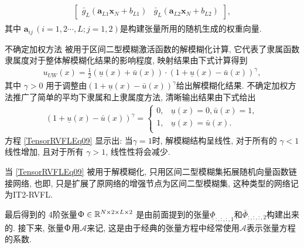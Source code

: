 {\begin{align*}
\begin{array} {cc}
\begin{bmatrix}
  \bar g_L(\bm {a} _{L1}  \bm x_N+b_{L1} )&\bar g_L(\bm {a} _{L2}  \bm x_N+b_{L2} )
\end{bmatrix},
\end{array}
\end{align*}
其中 $\bm {a} _{ij} \,(i=1,2\cdots,L; j=1,2)$是构建张量所用的随机生成的权重向量.
\begin{remark}
不确定加权方法\cite{RunklerCoupland2018-6356}  被用于区间二型模糊激活函数的解模糊化计算,
它代表了隶属函数隶属度对于整体解模糊化结果的影响程度, 映射结果由下式计算得到
\begin{align} \label{TensorRVFLEq08}
    u_{UW} (x) =\frac 1 2 (\underline u(x) + \bar u(x))\cdot (1+\underline u(x)-\bar u(x))^\gamma,
\end{align}
其中 $\gamma > 0$ 用于调整由$(1+\underline u(x)-\bar u(x))^\gamma$给出解模糊化结果.
不确定加权方法推广了简单的平均下隶属和上隶属度方法, 清晰输出结果由下式给出
\begin{align} \label{TensorRVFLEq09}
  (1+\underline u(x)-\bar u(x))^\gamma=
  \left\{
  \begin{array} {ll}
    0,& \underline u(x)=0, \bar u(x)=1,\\
    1,&\underline u(x)=\bar u(x).\\
  \end{array}
  \right.
\end{align}
方程 \eqref{TensorRVFLEq09} 显示出: 当$\gamma =1$时, 解模糊结构呈线性, 对于所有的 $\gamma<1$ 线性增加, 且对于所有 $\gamma>1$, 线性性将会减少.
\end{remark}
\begin{remark}
当 \eqref{TensorRVFLEq09} 被用于解模糊化, 只用区间二型模糊集拓展随机向量函数链接网络, 也即,  只是扩展了原网络的增强节点为区间二型模糊集,  这种类型的网络记为IT2-RVFL.
\end{remark}

最后得到的 4阶张量$\Upphi \in \mathbb R^{N\times 2\times L \times 2} $ 是由前面提到的张量$\underline\Phi_{:,:,:,1} $和$\bar \Phi_{:,:,:,2} $构建出来的.
接下来, 张量$\Upphi$用$\mathcal A$来记,  这是由于经典的张量方程中经常使用$\mathcal A$表示张量方程的系数.

}
